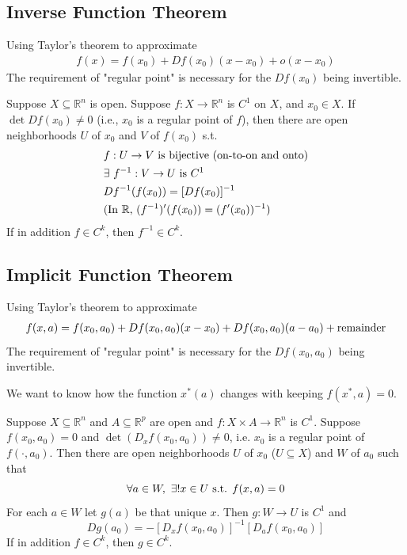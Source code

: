 \documentclass[11pt]{elegantbook}
\begin{document}
\subsection{Inverse Function Theorem}
Using Taylor's theorem to approximate
\begin{equation}
    \begin{aligned}
        f(x)=f(x_0)+Df(x_0)(x-x_0)+o(x-x_0)
    \end{aligned}
    \nonumber
\end{equation}
The requirement of "regular point" is necessary for the $Df(x_0)$ being invertible.
\begin{theorem}
    Suppose $X \subseteq \mathbb{R}^n$ is open. Suppose $f : X \rightarrow \mathbb{R}^n$ is $C^1$ on $X$, and $x_0\in X$. If $\det Df(x_0)\neq 0$ (i.e., $x_0$ is a regular point of $f$), then there are open neighborhoods $U$ of $x_0$ and $V$ of $f(x_0)$ s.t.
    \begin{equation}
        \begin{aligned}
            &f:U \rightarrow V \textnormal{ is bijective (on-to-on and onto)}\\
            &\exists\ f^{-1}:V \rightarrow U \textnormal{ is }C^1\\
            &Df^{-1}(f(x_0))=[Df(x_0)]^{-1}\\
            &\textnormal{(In $\mathbb{R}$, $(f^{-1})'(f(x_0))=(f'(x_0))^{-1}$)}
        \end{aligned}
        \nonumber
    \end{equation}
    If in addition $f \in C^k$, then $f^{-1} \in C^k$.
\end{theorem}

\subsection{Implicit Function Theorem}
Using Taylor's theorem to approximate
\begin{equation}
    \begin{aligned}
        f(x,a)=f(x_0,a_0)+Df(x_0,a_0)(x-x_0)+Df(x_0,a_0)(a-a_0)+\textnormal{remainder}
    \end{aligned}
    \nonumber
\end{equation}
The requirement of "regular point" is necessary for the $Df(x_0,a_0)$ being invertible.

We want to know how the function $x^*(a)$ changes with keeping $f(x^*,a)=0$.
\begin{theorem}
    Suppose $X \subseteq \mathbb{R}^n$ and $A \subseteq \mathbb{R}^p$ are open and $f : X \times A \rightarrow \mathbb{R}^n$ is $C^1$. Suppose $f(x_0, a_0) = 0$ and $\det(D_x f(x_0, a_0)) \neq 0$, i.e. $x_0$ is a regular point of $f(\cdot, a_0)$. Then there are open neighborhoods $U$ of $x_0$ ($U \subseteq X$) and $W$ of $a_0$ such that
    $$\forall a\in W,\ \exists ! x\in U \textnormal{ s.t. }f(x,a)=0$$
    For each $a \in W$ let $g(a)$ be that unique $x$. Then $g : W \rightarrow U$ is $C^1$ and $$Dg(a_0)=-[D_x f(x_0, a_0)]^{-1}[D_a f(x_0, a_0)]$$
    If in addition $f \in C^k$, then $g \in C^k$.
\end{theorem}
\end{document}
